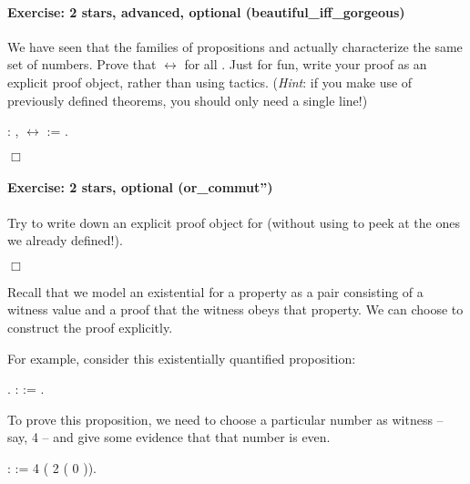 \documentclass[12pt]{report}
\begin{document}
\paragraph{Exercise: 2 stars, advanced, optional (beautiful\_iff\_gorgeous)}



 We have seen that the families of propositions  and
     actually characterize the same set of numbers.
    Prove that   \ensuremath{\leftrightarrow}   for all .  Just for
    fun, write your proof as an explicit proof object, rather than
    using tactics. (\textit{Hint}: if you make use of previously defined
    theorems, you should only need a single line!) \begin{coqdoccode}
\coqdocemptyline
\coqdocnoindent
{}  :\coqdoceol
\coqdocindent{1.00em}
\coqdockw{\ensuremath{\forall}} ,   \ensuremath{\leftrightarrow}   :=\coqdoceol
\coqdocindent{1.00em}
 .\coqdoceol
\end{coqdoccode}
\ensuremath{\Box} 

\paragraph{Exercise: 2 stars, optional (or\_commut'')}

 Try to write down an explicit proof object for  (without
    using  to peek at the ones we already defined!). \begin{coqdoccode}
\coqdocemptyline
\end{coqdoccode}
\ensuremath{\Box} 

 Recall that we model an existential for a property as a pair consisting of 
a witness value and a proof that the witness obeys that property. 
We can choose to construct the proof explicitly. 


For example, consider this existentially quantified proposition: \begin{coqdoccode}
\coqdocnoindent
{} .\coqdoceol
\coqdocemptyline
\coqdocnoindent
{}  :  := \coqdoceol
\coqdocindent{1.00em}
 \coqdocvar{\_} .\coqdoceol
\coqdocemptyline
\end{coqdoccode}
To prove this proposition, we need to choose a particular number
    as witness -- say, 4 -- and give some evidence that that number is
    even. \begin{coqdoccode}
\coqdocemptyline
\coqdocnoindent
{}  :  := \coqdoceol
\coqdocindent{1.00em}
 \coqdocvar{\_}  4 ( 2 ( 0 )).\coqdoceol
\coqdocemptyline
\end{coqdoccode}
\end{document}

